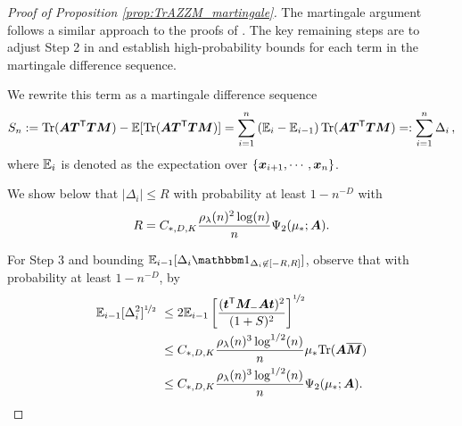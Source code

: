 \begin{proof}[Proof of Proposition \cref{prop:TrAZZM_martingale}]
The martingale argument follows a similar approach to the proofs of \citet[Propositions 3 and 5]{misiakiewicz2024non}. The key remaining steps are to adjust Step 2 in \citet[Proposition 3]{misiakiewicz2024non} and establish high-probability bounds for each term in the martingale difference sequence.

We rewrite this term as a martingale difference sequence
\[
\begin{aligned}
 S_n := {\rm Tr}({\boldsymbol A} {\boldsymbol T}^{\mathsf T} {\boldsymbol T} {\boldsymbol M}) - \mathbb{E}[{\rm Tr}({\boldsymbol A} {\boldsymbol T}^{\mathsf T} {\boldsymbol T} {\boldsymbol M})] = \sum_{i =1}^n  \left( \mathbb{E}_i - \mathbb{E}_{i-1} \right) {\rm Tr}( {\boldsymbol A} {\boldsymbol T}^{\mathsf T} {\boldsymbol T} {\boldsymbol M}) =:\sum_{i = 1}^n \Delta_i\,,
\end{aligned}
\]
where \(\mathbb{E}_i\) is denoted as the expectation over \(\{{\boldsymbol x}_{i+1},\cdots,{\boldsymbol x}_n\}\).

We show below that $|\Delta_i| \leq R$ with probability at least $1 - n^{-D}$ with
\begin{equation}\label{eq:Rchoice_AMZZM}
R =  C_{*,D,K} \frac{ \rho_\lambda(n)^2 \log(n)}{n} \Psi_2( \mu_* ; {\boldsymbol A}).
\end{equation}

For Step 3 and bounding $\E_{i-1}[\Delta_i \ind_{\Delta_i \not\in[-R,R]}] $, observe that with probability at least $1-n^{-D}$, by \citet[Lemma 4.(b)]{misiakiewicz2024non}
\[
\begin{aligned}
\mathbb{E}_{i-1} [ \Delta_i^2]^{\nicefrac{1}{2}} 
&~\leq 
2 \mathbb{E}_{i-1} \left[ \frac{({\boldsymbol t}^{\mathsf T} {\boldsymbol M}_- {\boldsymbol A} {\boldsymbol t})^2}{(1+S)^2}\right]^{\nicefrac{1}{2}} \\
&~\leq 
C_{*,D,K} \frac{\rho_\lambda (n)^3\log^{1/2}(n)}{n} \mu_* {\rm Tr}({\boldsymbol A} \overline{{\boldsymbol M}}) \\
&~\leq 
C_{*,D,K} \frac{\rho_\lambda (n)^3\log^{1/2}(n)}{n} \Psi_2 (\mu_* ; {\boldsymbol A}).
\end{aligned}
\]


\end{proof}
